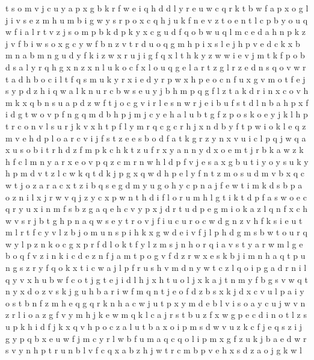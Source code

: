 \documentclass{article}
\begin{document}
t s o m v j c u y a p x g b k r f w e i q h d
d l
y r e u w
c q r k t b w f a p x o g l j i v s e z m h u
m b i g w y s r p o x c q h j u k f n e v z
t o e n
t l c p b y o
u q w f i a l r t v z j s o m p b k d
p k y x c g u d f q o b w
u q l m c e d a h n p k z j v f b i w s o x g
c y w f b n z v t r d u o q g m h p i x s l e
j h p v e d c k x b m n
a b m
n g u d y f k i z w x
r u j i g f q x l t h k y z w
w i e v j m t k f p o b d s a l y r q h g x n
z x n l u k o
c f x l
o u q g e l a r t z
g l r z e d n s
q o v w r t
a d h b o c i l t f q s m u k y r
x i e d y r p w
x h p e o c n f u
x g v m o t f e j s y p d z h i q w a l k n u r c b
w s e u y j b h m p q g f l z t a k d r i n x c o v
h m k x q b n s u a p d z w f t j o c g v i r l e
s n w
r j e i b u f s t d
l n b a h p x f i d g t
w o v p f n g q m d b h
p j
m j c y e h a l u b t g f z p o s k
o e y j k l h p t r
c o n v l s u r
j k v x h t p f l y m r q c
g c r h j x n d b y f t p w i o k l e q z m v
e h d p l o a r c v i j f s t
z e
e s b o d f a t k g r z y n x v u i c l p q j w
q a x u s o b i t r h d z f m p k
c h k t z u f r x y a n
n y d
x o e m t j r
b k a w
z k h f c l m n y a r x e o v p
q z c m r n w h l d p f v j e s a x g b u t i y o
y s u k
y h p m d v t z l c w k q
t d k j p g x
q w d h p e l y f n t z m o s u
d m v b x q c w t j o z a r
a c x t z i b q s e g
d m y u g o h
y c p n a j f e w t i m k d
s b p a o z n i l x j r w
v q j z y c x p w n t h d i f l o r u m
h l g t
i k t d p f a s w o e c q r y u x
i n m f s b z g a q e h c v y p x j d r t
u d p e g m i o k a z l q n f x c h w v s r j b t
g h
p n a q w s e y t r o v j f i u c
u r o c w
d g n z v h f k s i e u t m l
r t f c y v l z b j o m u n s p i h k x g w d e
i v f j l p h d g m s b w t o
u r q w y l p z n k o c g
x p r f d l o k t
f y l z m s j n h o r q i a v
s t y a r w m l g e b o q f v z i n k
i c d e z n f j a
m t
p o g v f d z r w x e s k b j i m n h a q t
p u n g s z r y f q o k x t i c w a j l
p f r
u s h v m d n y w t c z l q o i p g a
d r n i l q y v x h u b w f c o t j g
t e j
i d l h j
x h t u o l j
x k
a j t n m y f b g s v w
q t n y x d o z v s k j g u h b a r i w f m
q n t j e o f d z b s x
k j d x c v u l p a i y o s t b n f z m h e q
g q r k n h a c w j u t p x y m d e b l v i s o
a y c u j w v n z
r l i o a z g f v y m h j k e w
m q k l c a j r s t b u z f x w g p e
c d i n o t l z s u p k h
i d f j k x q v h p o c z a l u
t b a x o i p m s d w v u z k c f j e q
s z i j g y p q b x e u w
f j m
c y r l w b f u m a q
c q o l i p m x g f z u k j b a e d w r s v y n h
p t r u n b l v f
c q x a b z h j w t
r c m b p v e h x s d z a o j g k w l
\end{document}
